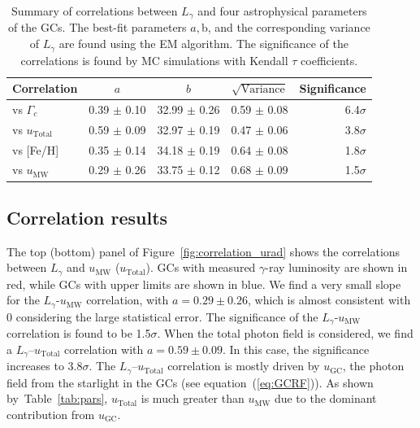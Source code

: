 \documentclass[doublespace,draft,nopageskip]{VTthesis} %
\begin{document}
\begin{table}
\centering
\caption{Summary of correlations between $L_\gamma$ and four astrophysical parameters of the GCs. The best-fit parameters $a, $b, and the corresponding variance of $L_\gamma$ are found using the EM algorithm. The significance of the correlations is found by MC simulations with Kendall $\tau$ coefficients.}
\label{tab:correlation}
\begin{tabular}{lcccr}
\hline
 Correlation & $a$ & $b$ & $\sqrt{\text{Variance}}$ & Significance\\
\hline
vs $\Gamma_c$ & 0.39 $\pm$ 0.10 & 32.99 $\pm$ 0.26 & 0.59 $\pm$ 0.08 & 6.4$\sigma$\\
vs $u_{\mathrm{Total}}$ & 0.59 $\pm$ 0.09 & 32.97 $\pm$ 0.19 & 0.47 $\pm$ 0.06 & 3.8$\sigma$\\
vs [Fe/H] & 0.35 $\pm$ 0.14 & 34.18 $\pm$ 0.19 & 0.64 $\pm$ 0.08 & 1.8$\sigma$\\
vs $u_\mathrm{MW}$ & 0.29 $\pm$ 0.26 & 33.75 $\pm$ 0.12 & 0.68 $\pm$ 0.09 & 1.5$\sigma$\\
\hline
\end{tabular}
\end{table}

\subsection{Correlation results}

The top (bottom) panel of Figure~\ref{fig:correlation_urad} shows the correlations between $L_\gamma$ and $u_\mathrm{MW}$ ($u_\mathrm{Total}$). GCs with measured $\gamma$-ray luminosity are shown in red, while GCs with upper limits are shown in blue. We find a very small slope for the $L_\gamma$-$u_\mathrm{MW}$ correlation, with $a=0.29 \pm 0.26$, which is almost consistent with 0 considering the large statistical error. The significance of the $L_\gamma$-$u_\mathrm{MW}$ correlation is found to be 1.5$\sigma$. When the total photon field is considered, we find a $L_\gamma$--$u_\mathrm{Total}$ correlation with $a = 0.59 \pm 0.09$. In this case, the significance increases to 3.8$\sigma$. The $L_\gamma$--$u_\mathrm{Total}$ correlation is mostly driven by $u_\mathrm{GC}$, the photon field from the starlight in the GCs (see equation~(\ref{eq:GCRF})). As shown by~Table~\ref{tab:pars}, $u_\mathrm{Total}$ is much greater than $u_\mathrm{MW}$ due to the dominant contribution from $u_\mathrm{GC}$. 
\end{document}
